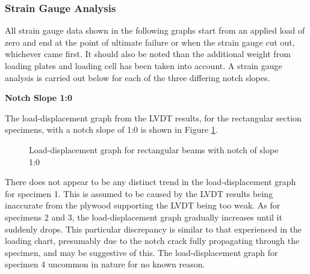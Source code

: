 \documentclass[11pt,a4paper]{article}
\numberwithin{equation}{subsection}
\begin{document}
\subsubsection{Strain Gauge Analysis}
All strain gauge data shown in the following graphs start from an applied load of zero and end at the point of ultimate failure or when the strain gauge cut out, whichever came first. It should also be noted than the additional weight from loading plates and loading cell has been taken into account. A strain gauge analysis is carried out below for each of the three differing notch slopes.

\pagebreak

\noindent
\textbf{Notch Slope 1:0}\par
\noindent
The load-displacement graph from the LVDT results, for the rectangular section specimens, with a notch slope of 1:0 is shown in Figure \ref{fig:Rect_10_def}. 
\vspace*{\baselineskip}
\begin{figure}[h]
	\begin{center}
	\end{center}
	\caption{Load-displacement graph for rectangular beams with notch of slope 1:0}
	\label{fig:Rect_10_def}
\end{figure}

\noindent
There does not appear to be any distinct trend in the load-displacement graph for specimen 1. This is assumed to be caused by the LVDT results being inaccurate from the plywood supporting the LVDT being too weak. As for specimens 2 and 3, the load-displacement graph gradually increases until it suddenly drops. This particular discrepancy is similar to that experienced in the loading chart, presumably due to the notch crack fully propagating through the specimen, and may be suggestive of this. The load-displacement graph for specimen 4 uncommon in nature for no known reason.   
\vspace*{\baselineskip}
\end{document}
